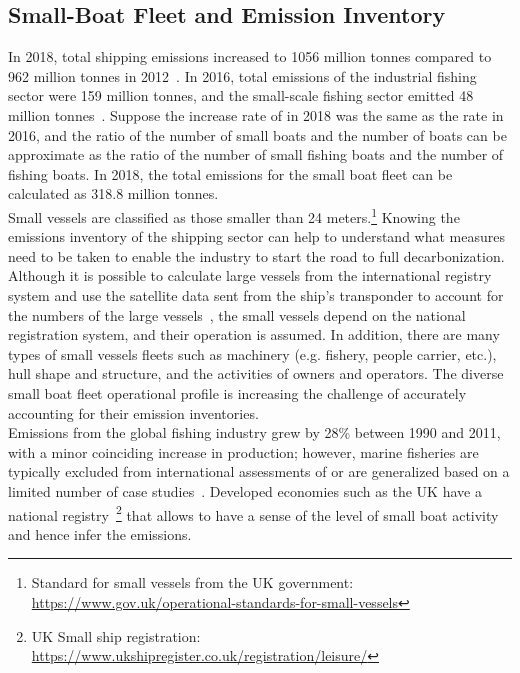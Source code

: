 \newpage
\subsection{Small-Boat Fleet and Emission Inventory}
In 2018, total shipping  emissions increased to 1056 million tonnes compared to 962 million tonnes in 2012~\cite{IMO2021Fourth}.
In 2016, total  emissions of the industrial fishing sector were 159 million tonnes, and the small-scale fishing sector emitted 48 million tonnes~\cite{GREER2019103382}. Suppose the increase rate of  in 2018 was the same as the rate in 2016, and the ratio of the number of small boats and the number of boats can be approximate as the ratio of the number of small fishing boats and the number of fishing boats. In 2018, the total  emissions for the small boat fleet can be calculated as 318.8 million tonnes.\\

Small vessels are classified as those smaller than 24 meters.\footnote{Standard for small vessels from the UK government: \href{https://www.gov.uk/operational-standards-for-small-vessels}{https://www.gov.uk/operational-standards-for-small-vessels}} Knowing the emissions inventory of the shipping sector can help to understand what measures need to be taken to enable the industry to start the road to full decarbonization. Although it is possible to calculate large vessels from the international registry system and use the satellite data sent from the ship's transponder to account for the numbers of the large vessels~\cite{IMO2021Fourth}, the small vessels depend on the national registration system, and their operation is assumed. In addition, there are many types of small vessels fleets such as machinery (e.g. fishery, people carrier, etc.), hull shape and structure, and the activities of owners and operators. The diverse small boat fleet operational profile is increasing the challenge of accurately accounting for their emission inventories.\\

Emissions from the global fishing industry grew by 28\% between 1990 and 2011, with a minor coinciding increase in production; however, marine fisheries are typically excluded from international assessments of  or are generalized based on a limited number of case studies~\cite{parker2018fuel}. Developed economies such as the UK have a national registry~\footnote{UK Small ship registration: \href{https://www.ukshipregister.co.uk/registration/leisure/}{https://www.ukshipregister.co.uk/registration/leisure/}} that allows to have a sense of the level of small boat activity and hence infer the  emissions.\\

